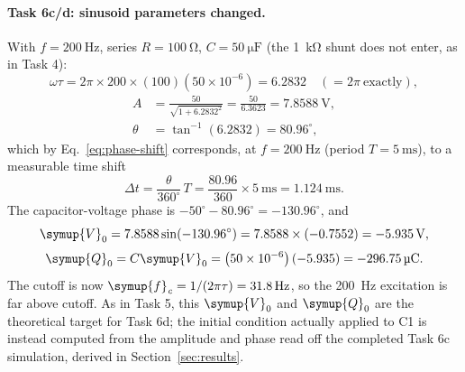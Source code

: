 \documentclass[12pt,a4paper]{article}
\begin{document}
	\paragraph{Task 6c/d: sinusoid parameters changed.}
	With $f = \SI{200}{\hertz}$, series $R = \SI{100}{\ohm}$,
	$C = \SI{50}{\micro\farad}$ (the \SI{1}{\kilo\ohm} shunt does not
	enter, as in Task 4):
	\begin{equation}
		\omega\tau = 2\pi \times 200 \times (100)\left(50\times 10^{-6}\right)
		= 6.2832 \quad \left(= 2\pi\ \text{exactly}\right),
	\end{equation}
	\begin{align}
		A &= \frac{50}{\sqrt{1 + 6.2832^2}}
		= \frac{50}{6.3623} = \SI{7.8588}{\volt},\\
		\theta &= \tan^{-1}(6.2832) = 80.96^{\circ},
	\end{align}
	which by Eq.~\eqref{eq:phase-shift} corresponds, at
	$f = \SI{200}{\hertz}$ (period $T = \SI{5}{\milli\second}$), to a
	measurable time shift
	\begin{equation}
		\Delta t = \frac{\theta}{360^{\circ}}\,T
		= \frac{80.96}{360} \times \SI{5}{\milli\second}
		= \SI{1.124}{\milli\second}.
	\end{equation}
	The capacitor-voltage phase is $-50^\circ - 80.96^\circ =
	-130.96^\circ$, and
	\begin{equation}
		\symup{V}_{0} = 7.8588 \sin(-130.96^{\circ})
		= 7.8588 \times (-0.7552) = \SI{-5.935}{\volt},
	\end{equation}
	\begin{equation}
		\symup{Q}_{0} = C \symup{V}_{0} = \left(50\times 10^{-6}\right)(-5.935)
		= \SI{-296.75}{\micro\coulomb}.
	\end{equation}
	The cutoff is now $\symup{f}_{\mathit{c}} = 1/(2\pi\tau) = \SI{31.8}{\hertz}$, so the
	\SI{200}{\hertz} excitation is far above cutoff.  As in Task 5,
	this $\symup{V}_{0}$ and $\symup{Q}_{0}$ are the theoretical
	target for Task 6d; the initial condition actually applied to C1
	is instead computed from the amplitude and phase read off the
	completed Task 6c simulation, derived in
	Section~\ref{sec:results}.
	
\end{document}
